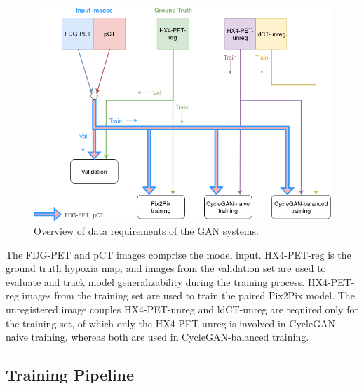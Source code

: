 \begin{figure}[h!]
    \centering
    \includegraphics[width=0.8\linewidth]{figures/Data/which_images_where.png}
    \caption{Overview of data requirements of the GAN systems.}
    \label{fig:which_images_where}
\end{figure}

The FDG-PET and pCT images comprise the model input. HX4-PET-reg is the ground truth hypoxia map, and images from the validation set are used to evaluate and track model generalizability during the training process. HX4-PET-reg images from the training set are used to train the paired Pix2Pix model. The unregistered image couples HX4-PET-unreg and ldCT-unreg are required only for the training set, of which only the HX4-PET-unreg is involved in CycleGAN-naive training, whereas both are used in CycleGAN-balanced training.


\subsection{Training Pipeline}
\label{training_pipeline}

